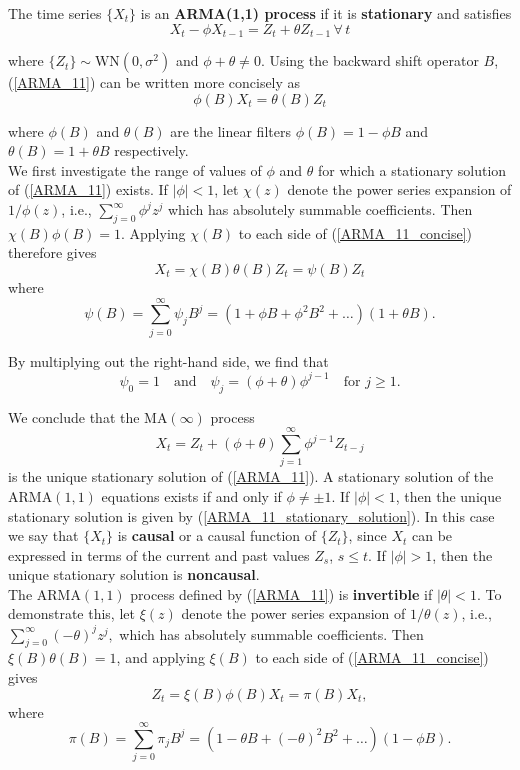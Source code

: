 \documentclass[11pt, a4paper]{article}
\numberwithin{equation}{section}
\theoremstyle{definition}
\begin{document}
The time series $\{X_t\}$ is an \textbf{ARMA(1,1) process} if it is \textbf{stationary} and satisfies
\begin{equation} \label{ARMA_11}
X_t - \phi X_{t-1} = Z_t + \theta Z_{t-1} \, \forall \, t
\end{equation}

where $\{Z_t\} \sim \text{WN}(0,\sigma^2)$ and $\phi + \theta \neq 0$. Using the backward shift operator $B$, (\ref{ARMA_11}) can be written more concisely as
\begin{equation} \label{ARMA_11_concise}
\phi(B)X_t = \theta(B)Z_t
\end{equation}

where $\phi(B)$ and $\theta(B)$ are the linear filters $\phi(B) = 1 - \phi B$ and $\theta(B) = 1 + \theta B$ respectively. \\[0.2em]

We first investigate the range of values of $\phi$ and $\theta$ for which a stationary solution of (\ref{ARMA_11}) exists. If $|\phi| < 1$, let $\chi(z)$ denote the power series expansion of $1/\phi(z)$, i.e.,
$\sum \limits_{j=0}^{\infty} \phi^j z^j$ which has absolutely summable coefficients. Then $\chi(B)\phi(B) = 1$. Applying $\chi(B)$ to each side of (\ref{ARMA_11_concise}) therefore gives
$$X_t = \chi(B)\theta(B)Z_t = \psi(B)Z_t$$
where
$$\psi(B) = \sum \limits_{j=0}^{\infty} \psi_j B^j = (1 + \phi B + \phi^2 B^2 + \ldots)(1 + \theta B).$$

By multiplying out the right-hand side, we find that
$$\psi_0 = 1 \quad \text{and} \quad \psi_j = (\phi + \theta)\phi^{j-1}
\quad \text{for } j \geq 1.$$

We conclude that the MA$(\infty)$ process
\begin{equation} \label{ARMA_11_stationary_solution}
X_t = Z_t + (\phi + \theta)\sum \limits_{j=1}^{\infty} \phi^{j-1} Z_{t-j}
\end{equation}
is the unique stationary solution of (\ref{ARMA_11}). A stationary solution of the ARMA$(1,1)$ equations exists if and only if $\phi \neq \pm 1$. If $|\phi| < 1$, then the unique stationary solution is given by (\ref{ARMA_11_stationary_solution}). In this case we say that $\{X_t\}$ is \textbf{causal} or a causal function of $\{Z_t\}$, since $X_t$ can be expressed in terms of the current and past values $Z_s$, $s \leq t$. If $|\phi| > 1$, then the unique stationary solution is \textbf{noncausal}. \\[0.2em]

The ARMA$(1,1)$ process defined by (\ref{ARMA_11}) is \textbf{invertible} if $|\theta| < 1$. To demonstrate this, let $\xi(z)$ denote the power series expansion of $1/\theta(z)$, i.e., $\sum \limits_{j=0}^{\infty} (-\theta)^j z^j,$ which has absolutely summable coefficients. Then $\xi(B)\theta(B) = 1$, and applying $\xi(B)$ to each side of (\ref{ARMA_11_concise}) gives
$$Z_t = \xi(B)\phi(B)X_t = \pi(B)X_t,$$
where
$$\pi(B) = \sum \limits_{j=0}^{\infty} \pi_j B^j = (1 - \theta B + (-\theta)^2 B^2 + \ldots)(1 - \phi B).$$
\end{document}
